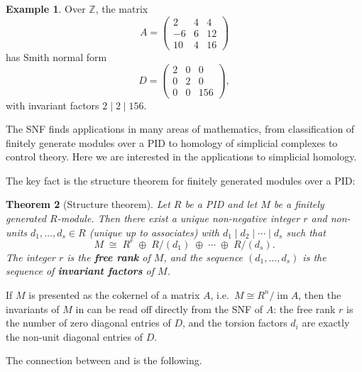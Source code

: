 \documentclass[11pt]{article}
\theoremstyle{plain}
\newtheorem{theorem}{Theorem}[section]
\newtheorem{proposition}[theorem]{Proposition}
\theoremstyle{definition}
\newtheorem{example}[theorem]{Example}
\theoremstyle{remark}
\begin{document}
\begin{example}
Over $\mathbb{Z}$, the matrix
\[
A = \begin{pmatrix} 2 & 4 & 4 \\ -6 & 6 & 12 \\ 10 & 4 & 16 \end{pmatrix}
\]
has Smith normal form
\[
D = \begin{pmatrix} 2 & 0 & 0 \\ 0 & 2 & 0 \\ 0 & 0 & 156 \end{pmatrix},
\]
with invariant factors $2 \mid 2 \mid 156$.
\end{example}

The SNF finds applications in many areas of mathematics, from classification of finitely generate modules over a PID to homology of simplicial complexes to control theory. Here we are interested in the applications to simplicial homology. 

The key fact is the structure theorem for finitely generated modules over a PID: 

\begin{theorem}[Structure theorem]\label{thm:structure}
    Let $R$ be a PID and let $M$ be a finitely generated $R$-module. Then there exist a unique non-negative integer $r$ and non-units $d_1, \ldots, d_s \in R$ (unique up to associates) with $d_1 \mid d_2 \mid \cdots \mid d_s$ such that
    \[
    M \;\cong\; R^{r} \;\oplus\; R/(d_1) \;\oplus\; \cdots \;\oplus\; R/(d_s).
    \]
    The integer $r$ is the \textbf{free rank} of $M$, and the sequence $(d_1, \ldots, d_s)$ is the sequence of \textbf{invariant factors} of $M$.
\end{theorem}

If $M$ is presented as the cokernel of a matrix $A$, i.e.\ $M \cong R^n / \operatorname{im} A$, then the invariants of $M$ in  can be read off directly from the SNF of $A$: the free rank $r$ is the number of zero diagonal entries of $D$, and the torsion factors $d_i$ are exactly the non-unit diagonal entries of $D$.

The connection between  and  is the following.

\end{document}
